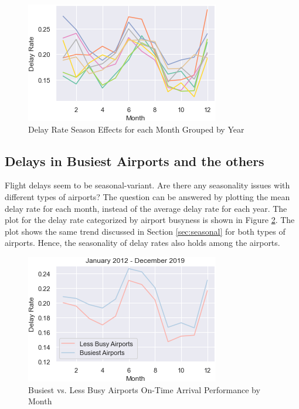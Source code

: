 \documentclass[11pt]{article}
\begin{document}
\begin{figure}[h!]
\centering
\includegraphics[width = \columnwidth]{line_plot1}
\caption{Delay Rate Season Effects for each Month Grouped by Year}\label{fig:line_plot1}
\end{figure}

\subsection{Delays in Busiest Airports and the others}\label{sec:busy}
Flight delays seem to be seasonal-variant. Are there any seasonality issues with different types of airports? The question can be answered by plotting the mean delay rate for each month, instead of the average delay rate for each year. The plot for the delay rate categorized by airport busyness is shown in Figure \ref{fig:line_plot2}. The plot shows the same trend discussed in Section \ref{sec:seasonal} for both types of airports. Hence, the seasonality of delay rates also holds among the airports.

\begin{figure}[h!]
\centering
\includegraphics[width = \columnwidth]{line_plot2}
\caption{Busiest vs. Less Busy Airports On-Time Arrival Performance by Month}\label{fig:line_plot2}
\end{figure}
\end{document}
